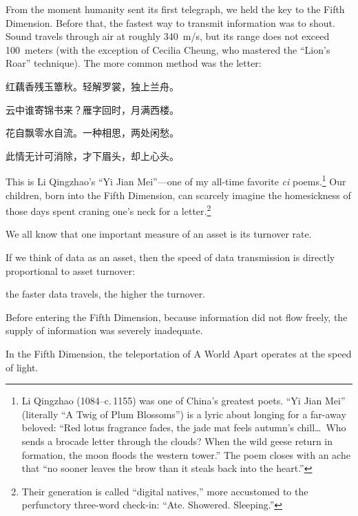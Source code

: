 \vspace{1em}

From the moment humanity sent its first telegraph, we held the key to the Fifth Dimension. Before that, the fastest way to transmit information was to shout. Sound travels through air at roughly 340~m/s, but its range does not exceed 100~meters (with the exception of Cecilia Cheung, who mastered the ``Lion's Roar'' technique). The more common method was the letter:

\begin{myquote}
红藕香残玉簟秋。轻解罗裳，独上兰舟。

云中谁寄锦书来？雁字回时，月满西楼。

花自飘零水自流。一种相思，两处闲愁。

此情无计可消除，才下眉头，却上心头。
\end{myquote}

This is Li Qingzhao's ``Yi Jian Mei''---one of my all-time favorite \textit{ci} poems.\footnote{Li Qingzhao (1084--c.\,1155) was one of China's greatest poets. ``Yi Jian Mei'' (literally ``A Twig of Plum Blossoms'') is a lyric about longing for a far-away beloved: ``Red lotus fragrance fades, the jade mat feels autumn's chill\ldots\ Who sends a brocade letter through the clouds? When the wild geese return in formation, the moon floods the western tower.'' The poem closes with an ache that ``no sooner leaves the brow than it steals back into the heart.''} Our children, born into the Fifth Dimension, can scarcely imagine the homesickness of those days spent craning one's neck for a letter.\footnote{Their generation is called ``digital natives,'' more accustomed to the perfunctory three-word check-in: ``Ate. Showered. Sleeping.''}

\vspace{1em}

We all know that one important measure of an asset is its turnover rate.

If we think of data as an asset, then the speed of data transmission is directly proportional to asset turnover:

the faster data travels, the higher the turnover.

\vspace{1em}

Before entering the Fifth Dimension, because information did not flow freely, the supply of information was severely inadequate.

In the Fifth Dimension, the teleportation of A World Apart operates at the speed of light.

